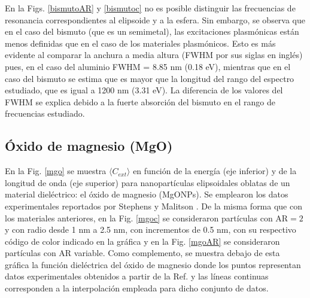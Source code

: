 En la Figs. \ref{bismutoAR} y \ref{bismutoc} no es posible distinguir las frecuencias de resonancia correspondientes al elipsoide y a la esfera. Sin embargo, se observa que en el caso del bismuto (que es un semimetal), las excitaciones plasmónicas están menos definidas que en el caso de los materiales plasmónicos. Esto es más evidente al comparar la anchura a media altura (FWHM por sus siglas en inglés) pues, en el caso del aluminio FWHM = 8.85 nm (0.18 eV), mientras que en el caso del bismuto se estima que es mayor que la longitud del rango del espectro estudiado, que es igual a 1200 nm (3.31 eV). La diferencia de los valores del FWHM se explica debido a la fuerte absorción del bismuto en el rango de frecuencias estudiado.


\subsection*{Óxido de magnesio (MgO)}
En la Fig. \ref{mgo} se muestra $\langle C_{ext}\rangle$ en función de la energía (eje inferior) y de la longitud de onda (eje superior) para nanopartículas elipsoidales oblatas de un material dieléctrico: el óxido de magnesio (MgONPs). Se emplearon los datos experimentales reportados por Stephens y Malitson \cite{MgO}. De la misma forma que con los materiales anteriores, en la Fig. \ref{mgoc} se consideraron partículas con AR$=2$ y con radio desde 1  nm a 2.5 nm, con incrementos de 0.5 nm, con su respectivo código de color indicado en la gráfica y en la Fig. \ref{mgoAR} se consideraron partículas con AR variable.  Como complemento, se muestra debajo de esta gráfica  la función dieléctrica del óxido de magnesio donde los puntos representan datos experimentales obtenidos a partir de la Ref. \cite{MgO} y las líneas continuas corresponden a la interpolación empleada para dicho conjunto de datos.\\

